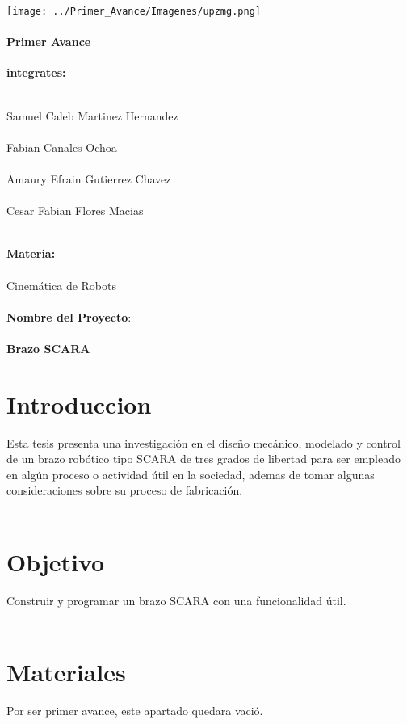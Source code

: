 \documentclass[10pt,a4paper]{article}
\begin{document}
\begin{center}
\texttt{[image: ../Primer\_Avance/Imagenes/upzmg.png]} 
\end{center}
\paragraph{\Huge Primer Avance} \textbf{\Huge integrates:} \\ \\
	\begin{Large}
		Samuel Caleb Martinez Hernandez\\ \\
		Fabian Canales Ochoa\\ \\
		Amaury Efrain Gutierrez Chavez\\ \\
		Cesar Fabian Flores Macias\\ \\
		\end{Large}
		
	
\textbf{\Huge Materia:}\\ \\
		{\Large Cinemática de Robots}\\ \\
	
{\Huge \textbf{Nombre del Proyecto}:}\\ \\
		\textbf{\Large Brazo SCARA}
		
\section{Introduccion}
{\Large Esta tesis presenta una investigación en el 			diseño mecánico, modelado y control de un 				brazo robótico tipo SCARA de tres grados de 			libertad para ser empleado en algún proceso o 			actividad útil en la sociedad, ademas de tomar 			algunas consideraciones sobre su proceso de 			fabricación.} \\ \\

\section{{\Huge Objetivo}}
{\Large Construir y programar un brazo SCARA con una funcionalidad útil.}\\ \\

\section{{\Huge Materiales}}
{\Large Por ser primer avance, este apartado quedara vació.}\\ \\	
\end{document}
